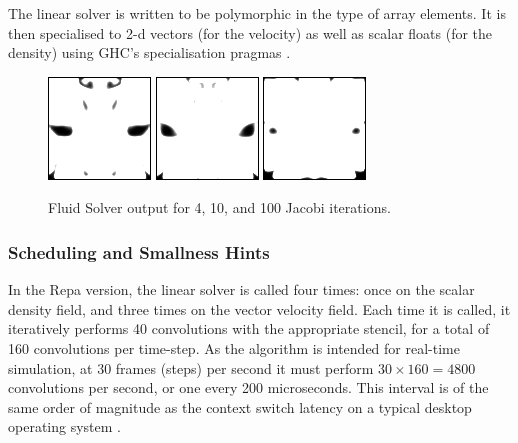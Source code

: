The linear solver is written to be polymorphic in the type of array elements. It is then specialised to 2-d vectors (for the velocity) as well as scalar floats (for the density) using GHC's specialisation pragmas \cite{PeytonJones:RewriteRules}. 


\begin{figure}
\begin{center}
\includegraphics[scale=0.75]{figs/fluid/0100-jacobi4}
\includegraphics[scale=0.75]{figs/fluid/0100-jacobi10}
\includegraphics[scale=0.75]{figs/fluid/0100-jacobi100}
\caption{Fluid Solver output for 4, 10, and 100 Jacobi iterations.}
\label{figure:Fluid}
\end{center}
\end{figure}


\subsubsection{Scheduling and Smallness Hints}
\label{section:Smallness}
In the Repa version, the linear solver is called four times: once on the scalar density field, and three times on the vector velocity field. Each time it is called, it iteratively performs 40 convolutions with the appropriate stencil, for a total of 160 convolutions per time-step. As the algorithm is intended for real-time simulation, at 30 frames (steps) per second it must perform $30 \times 160 = 4800$ convolutions per second, or one every 200 microseconds. This interval is of the same order of magnitude as the context switch latency on a typical desktop operating system \cite{Li:ContextSwitch}.


